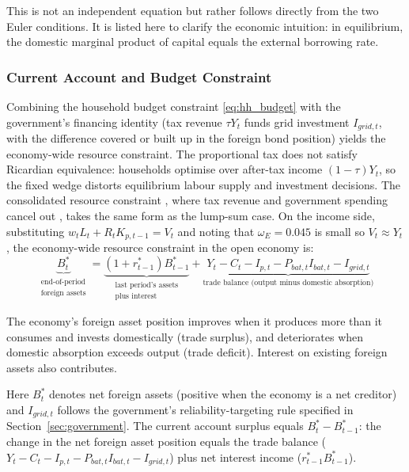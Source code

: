 \documentclass[12pt, a4paper]{article}
\begin{document}
	\noindent This is not an independent equation but rather follows directly from the two Euler conditions. It is listed here to clarify the economic intuition: in equilibrium, the domestic marginal product of capital equals the external borrowing rate.
	
	\subsubsection{Current Account and Budget Constraint}
	
	Combining the household budget constraint \eqref{eq:hh_budget} with the government's financing identity (tax revenue $\tau Y_t$ funds grid investment $I_{grid,t}$, with the difference covered or built up in the foreign bond position) yields the economy-wide resource constraint. The proportional tax does not satisfy Ricardian equivalence: households optimise over after-tax income $(1-\tau)Y_t$, so the fixed wedge distorts equilibrium labour supply and investment decisions. The consolidated resource constraint ,  where tax revenue and government spending cancel out ,  takes the same form as the lump-sum case. On the income side, substituting $w_t L_t + R_t K_{p,t-1} = V_t$ and noting that $\omega_E = 0.045$ is small so $V_t \approx Y_t$, the economy-wide resource constraint in the open economy is:
	\begin{equation}
		\underbrace{B^*_t}_{\substack{\text{end-of-period}\\\text{foreign assets}}} = \underbrace{(1 + r^*_{t-1}) B^*_{t-1}}_{\substack{\text{last period's assets}\\\text{plus interest}}} + \underbrace{Y_t - C_t - I_{p,t} - P_{bat,t} I_{bat,t} - I_{grid,t}}_{\text{trade balance (output minus domestic absorption)}}
		\label{eq:current_account}
	\end{equation}
	
	The economy's foreign asset position improves when it produces more than it consumes and invests domestically (trade surplus), and deteriorates when domestic absorption exceeds output (trade deficit). Interest on existing foreign assets also contributes.
	
	Here $B^*_t$ denotes net foreign assets (positive when the economy is a net creditor) and $I_{grid,t}$ follows the government's reliability-targeting rule specified in Section~\ref{sec:government}. The current account surplus equals $B^*_t - B^*_{t-1}$: the change in the net foreign asset position equals the trade balance ($Y_t - C_t - I_{p,t} - P_{bat,t} I_{bat,t} - I_{grid,t}$) plus net interest income ($r^*_{t-1} B^*_{t-1}$).
	
\end{document}
